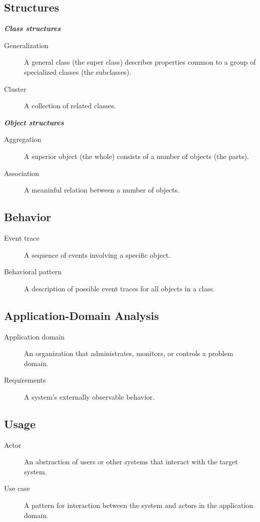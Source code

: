 \subsection{Structures}
\large\textbf{\textit{Class structures}}\normalsize
\begin{description}
    \item[Generalization] A general class (the super class) describes properties common to a group of specialized classes (the subclasses).
    \item[Cluster] A collection of related classes.
\end{description}
\large\textbf{\textit{Object structures}}\normalsize
\begin{description}
    \item[Aggregation] A superior object (the whole) consists of a number of objects (the parts).
    \item[Association] A meaninful relation between a number of objects.
\end{description}

\subsection{Behavior}
\begin{description}
    \item[Event trace] A sequence of events involving a specific object.
    \item[Behavioral pattern] A description of possible event traces for all objects in a class.
\end{description}

\subsection{Application-Domain Analysis}
\begin{description}
    \item[Application domain] An organization that administrates, monitors, or controls a problem domain.
    \item[Requirements] A system's externally observable behavior.
\end{description}

\subsection{Usage}
\begin{description}
    \item[Actor] An abstraction of users or other systems that interact with the target system.
    \item[Use case] A pattern for interaction between the system and actors in the application domain.
\end{description}

